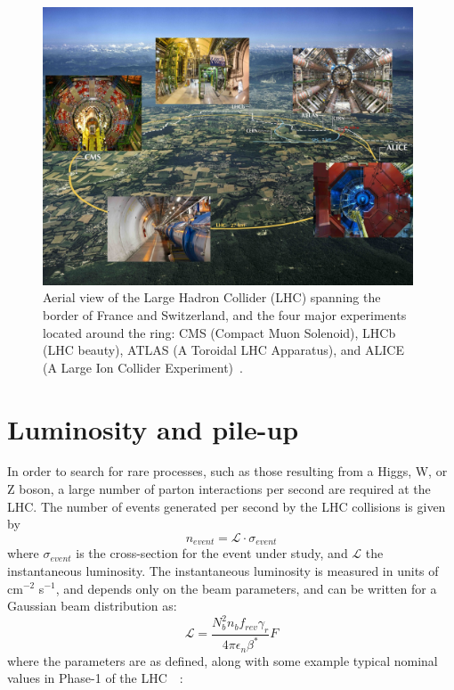 \begin{figure}[ht]
    \centering
    \includegraphics[width=11cm]{figures/ch-2-cern-cms/aerial-view-LHC-ring.jpeg}
    \caption[Aerial view of the Large Hadron Collider (LHC).]{Aerial view of the Large Hadron Collider (LHC) spanning the border of France and Switzerland, and the four major experiments located around the ring: CMS (Compact Muon Solenoid), LHCb (LHC beauty), ATLAS (A Toroidal LHC Apparatus), and ALICE (A Large Ion Collider Experiment)~\cite{OPEN-PHO-ACCEL-2017-005}.}
    \label{fig:aerial-view-LHC-ring}
\end{figure}



\section{Luminosity and pile-up}
\label{section:luminosity_and_pileup}
In order to search for rare processes, such as those resulting from a Higgs, W, or Z boson, a large number of parton interactions per second are required at the LHC. The number of events generated per second by the LHC collisions is given by
\begin{equation}
     n_{event} = \mathcal{L} \cdot \sigma_{event}
    \label{eqn:nEvents}
\end{equation} 
where $\sigma_{event}$ is the cross-section for the event under study, and $\mathcal{L}$ the instantaneous luminosity. The instantaneous luminosity is measured in units of cm$^{-2}$ s$^{-1}$, and depends only on the beam parameters, and can be written for a Gaussian beam distribution as:
\begin{equation}
    \mathcal{L} = \frac{N_b^2 n_b f_{rev} \gamma_r}{4\pi \epsilon_n \beta^*} F
\end{equation}
where the parameters are as defined, along with some example typical nominal values in Phase-1 of the LHC~\cite{CERN-luminosity-accelerator-school-article}~\cite{ipac2012-proceedings}:

